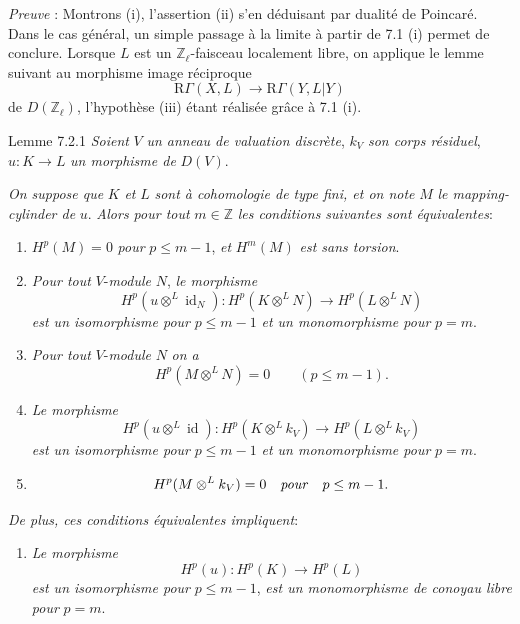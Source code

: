 \emph{Preuve} : Montrons (i), l'assertion (ii) s'en déduisant par dualité de Poincaré. Dans le cas général, un simple passage à la limite à partir de 7.1 (i) permet de conclure. Lorsque $L$ est un $\mathbb{Z}_\ell$-faisceau localement libre, on applique le lemme suivant au morphisme image réciproque
\[
\mathrm{R}\Gamma(X,L)\to \mathrm{R}\Gamma(Y,L|Y)
\]
de $D(\mathbb{Z}_\ell)$, l'hypothèse (iii) étant réalisée grâce à 7.1 (i).

\begin{statement}{Lemme 7.2.1}
\emph{Soient} $V$ \emph{un anneau de valuation discrète}, $k_V$ \emph{son corps résiduel}, $u:K\to L$ \emph{un morphisme de} $D(V)$.

\emph{On suppose que} $K$ \emph{et} $L$ \emph{sont à cohomologie de type fini, et on note} $M$ \emph{le mapping-cylinder de} $u$. \emph{Alors pour tout} $m\in\mathbb{Z}$ \emph{les conditions suivantes sont équivalentes}:
\begin{enumerate}[label=(\roman*)]
\item $H^p(M)=0$ \emph{pour} $p\le m-1$, \emph{et} $H^m(M)$ \emph{est sans torsion}.
\item
\emph{Pour tout} $V$-\emph{module} $N$, \emph{le morphisme}
\[
H^p(u\otimes^L\operatorname{id}_N):H^p(K\otimes^L N)\to H^p(L\otimes^L N)
\]
\emph{est un isomorphisme pour} $p\le m-1$ \emph{et un monomorphisme pour} $p=m$.
\item[(ii bis)] \emph{Pour tout} $V$-\emph{module} $N$ \emph{on a}
\[
H^p(M\otimes^L N)=0\qquad(p\le m-1).
\]
\item \emph{Le morphisme}
\[
H^p(u\otimes^L\operatorname{id}):H^p(K\otimes^L k_V)\to H^p(L\otimes^L k_V)
\]
\emph{est un isomorphisme pour} $p\le m-1$ \emph{et un monomorphisme pour} $p=m$.
\item[(iii bis)]
\[
H^p(M\otimes^L k_V)=0\quad\text{\emph{pour}}\quad p\le m-1.
\]
\end{enumerate}
\emph{De plus, ces conditions équivalentes impliquent}:
\begin{enumerate}[label=(\roman* bis)]
\item \emph{Le morphisme}
\[
H^p(u):H^p(K)\to H^p(L)
\]
\emph{est un isomorphisme pour} $p\le m-1$, \emph{est un monomorphisme de conoyau libre pour} $p=m$.
\end{enumerate}
\end{statement}

